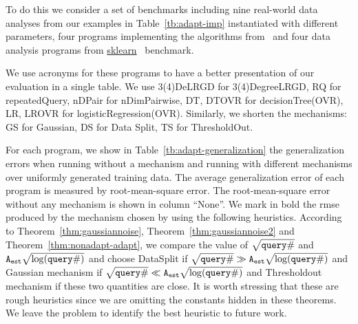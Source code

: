 To do this we consider a set of benchmarks including 
nine real-world data analyses from our examples in Table~\ref{tb:adapt-imp} instantiated with different parameters,
four programs implementing the algorithms from~\cite{Jamieson2015TheAO}
and four data analysis programs 
from \hyperlink{https://github.com/scikit-learn/scikit-learn/tree/main/examples}{sklearn}~\cite{SklearnBenchmark} benchmark.

{We use acronyms for these programs to have a better presentation of our evaluation in a single table. We use
 3(4)DeLRGD for 3(4)DegreeLRGD, RQ for repeatedQuery, nDPair for nDimPairwise,
DT, DTOVR for decisionTree(OVR), LR, LROVR for logisticRegression(OVR). Similarly, we shorten the mechanisms: GS for Gaussian, DS for Data Split,
TS for ThresholdOut.  }

For each program, we show in Table~\ref{tb:adapt-generalization} the
generalization errors when running without a mechanism and running
with different mechanisms over uniformly generated training data.  The
average generalization error of each program is measured by
root-mean-square error.  The root-mean-square error without any
mechanism is shown in column ``None''. 
We mark in bold the rmse
produced by the mechanism chosen by {\THESYSTEM} using the following
heuristics.  According to Theorem~\ref{thm:gaussiannoise},
Theorem~\ref{thm:gaussiannoise2} and Theorem~\ref{thm:nonadapt-adapt},
we compare the value of $\sqrt{{\tt query} \#}$ and
${\mathtt{A_{est}}}\sqrt{\log({\tt query} \#)}$ and choose DataSplit if
$\sqrt{{\tt query} \#} \gg {\ensuremath{\mathtt{A_{est}}}}\sqrt{\log({\tt query} \#)}$ and Gaussian
mechanism if $\sqrt{{\tt query} \#} \ll {\ensuremath{\mathtt{A_{est}}}}\sqrt{\log({\tt query} \#)}$ and
Thresholdout mechanism if these two quantities are close. 
 It is worth
stressing that these are rough heuristics since we are omitting the
constants hidden in these theorems. We leave the problem to identify
the best heuristic to future work.


